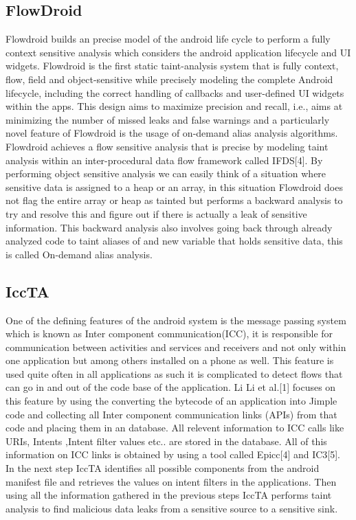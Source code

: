 \documentclass[journal]{IEEEtran}
\begin{document}
\subsection{FlowDroid}
	Flowdroid builds an precise model of the android life cycle to perform a fully context sensitive analysis which considers the android application lifecycle and UI widgets.  Flowdroid is the first static taint-analysis system that is fully context, flow, field and object-sensitive while precisely modeling the complete Android lifecycle, including the correct handling of callbacks and user-defined UI widgets within the apps. This design aims to maximize precision and recall, i.e., aims at minimizing the number of missed leaks and false warnings and a particularly novel feature of Flowdroid is the usage of on-demand alias analysis algorithms.\\
	Flowdroid achieves a flow sensitive analysis that is precise by modeling taint analysis within an inter-procedural data flow framework called IFDS[4]. By performing object sensitive analysis we can easily think of a situation where sensitive data is assigned to a heap or an array, in this situation Flowdroid does not flag the entire array or heap as tainted but performs a backward analysis to try and resolve this and figure out if there is actually a leak of sensitive information. This backward analysis also involves going back through already analyzed code to taint aliases of and new variable that holds sensitive data, this is called On-demand alias analysis. \\
\subsection{IccTA}
	One of the defining features of the android system is the message passing system which is known as Inter component communication(ICC), it is responsible for communication between activities and services and receivers and not only within one application but among others installed on a phone as well. This feature is used quite often in all applications as such it is complicated to detect flows that can go in and out of the code base of the application. Li Li et al.[1] focuses on this feature by using the converting the bytecode of an application into Jimple code and collecting all Inter component communication links (APIs) from that code and placing them in an database. All relevent information to ICC calls like URIs, Intents ,Intent filter values etc.. are stored in the database. All of this information on ICC links is obtained by using a tool called Epicc[4] and IC3[5].\\
	In the next step IccTA identifies all possible components from the android manifest file and retrieves the values on intent filters in the applications. Then using all the information gathered in the previous steps IccTA performs taint analysis to find malicious data leaks from a sensitive source to a sensitive sink.\\
\end{document}

